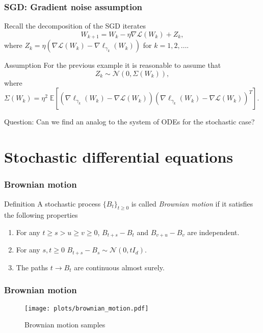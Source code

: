 \documentclass[17pt,institute=e10]{tuhh_presentation}
\newcommand{\CL}{\mathcal{L}}
\newcommand{\E}[1]{\mathbb{E}\left[{#1} \right]}
\begin{document}
\begin{frame}[fragile]
  \frametitle{SGD: Gradient noise assumption}
  Recall the decomposition of the SGD iterates
  \begin{equation*}
    W_{k+1} = W_k - \eta \nabla \CL(W_k) + Z_k,
  \end{equation*}
  where $Z_k = \eta \left(\nabla \CL(W_k) - \nabla \ell_{\gamma_k} (W_k) \right)$ for $k = 1,2,\dots$.
  \begin{block}{Assumption}
  For the previous example it is reasonable to assume that 
  \begin{equation*}
    Z_k \sim \mathcal{N}(0, \Sigma(W_k)),
  \end{equation*}
    where $\Sigma(W_k) = \eta^2 \; \E{\left(\nabla \ell_{\gamma_k}(W_k) - \nabla \CL(W_k)\right)\left(\nabla \ell_{\gamma_k}(W_k) - \nabla \CL(W_k)\right)^T}$.
\end{block}
Question: Can we find an analog to the system of ODEs for the stochastic case?
\end{frame}
\section{Stochastic differential equations}
\begin{frame}
  \frametitle{Brownian motion}
  \begin{block}{Definition}
    A stochastic process $\{B_t\}_{t \geq 0}$ is called \emph{\textcolor{purple-pontifex}{Brownian motion}} if it satisfies the following properties
  \begin{enumerate}
    \item For any $t \geq s > u \geq v \geq 0$, $B_{t+s} - B_t$ and $B_{v+u} - B_v$ are independent.
    \item For any $s,t \geq 0$ $B_{t+s} - B_s \sim \mathcal{N}(0, tI_d)$.
    \item The paths $t \rightarrow B_t$ are continuous almost surely.
  \end{enumerate}
  \end{block}
\end{frame}
\begin{frame}[fragile]
  \frametitle{Brownian motion}
    \vspace{-1cm}
    \begin{figure}
      \centering
      \texttt{[image: plots/brownian\_motion.pdf]}
      \caption{Brownian motion samples}
    \end{figure}
\end{frame}
\end{document}
